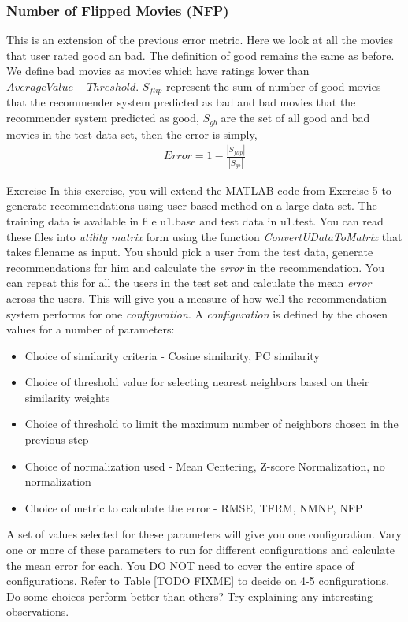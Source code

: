   \subsubsection{Number of Flipped Movies (NFP)}
  This is an extension of the previous error metric. Here we look at all the movies that user rated good an bad. The definition of good remains the same as before. We define bad movies as movies which have ratings lower than $AverageValue - Threshold$. $S_{flip}$ represent the sum of number of good movies that the recommender system predicted as bad and bad movies that the recommender system predicted as good, $S_{gb}$ are the set of all good and bad movies in the test data set, then the error is simply, 
  \begin{align*}
  Error = 1 - \frac{|S_{flip}|}{|S_{gb}|}
  \end{align*}

\begin{myremark}{Exercise }
In this exercise, you will extend the MATLAB code from Exercise 5 to generate recommendations using user-based method on a large data set. The training data is available in file u1.base and test data in u1.test. You can read these files into \textit{utility matrix} form using the function \textit{ConvertUDataToMatrix} that takes filename as input. You should pick a user from the test data, generate recommendations for him and calculate the \textit{error} in the recommendation. You can repeat this for all the users in the test set and calculate the mean \textit{error} across the users. This will give you a measure of how well the recommendation system performs for one \textit{configuration}.
A \textit{configuration} is defined by the chosen values for a number of parameters:
\begin{itemize}
\item{}Choice of similarity criteria - Cosine similarity, PC similarity
\item{}Choice of threshold value for selecting nearest neighbors based on their similarity weights
\item{}Choice of threshold to limit the maximum number of neighbors chosen in the previous step
\item{}Choice of normalization used - Mean Centering, Z-score Normalization, no normalization
\item{}Choice of metric to calculate the error - RMSE, TFRM, NMNP, NFP
\end{itemize}
A set of values selected for these parameters will give you one configuration. Vary one or more of these parameters to run for different configurations and calculate the mean error for each. You DO NOT need to cover the entire space of configurations. Refer to Table [TODO FIXME] to decide on 4-5 configurations. Do some choices perform better than others? Try explaining any interesting observations.
\end{myremark}
